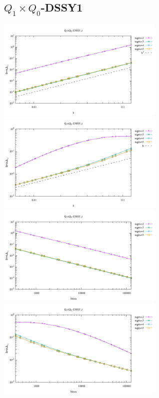 \newpage
\subsection*{$Q_1\times Q_0$-DSSY1}
\begin{center}
\includegraphics[width=8cm]{python_codes/fieldstone_120/results/DSSY1Q0-velocity-h.pdf}
\includegraphics[width=8cm]{python_codes/fieldstone_120/results/DSSY1Q0-pressure-h.pdf}
\includegraphics[width=8cm]{python_codes/fieldstone_120/results/DSSY1Q0-velocity-Nfem.pdf}
\includegraphics[width=8cm]{python_codes/fieldstone_120/results/DSSY1Q0-pressure-Nfem.pdf}
\end{center}


